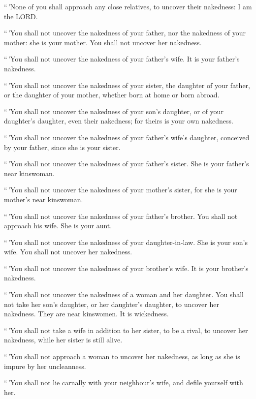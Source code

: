  ``\,'None of you shall approach any close relatives, to
uncover their nakedness: I am the LORD.

 ``\,'You shall not uncover the nakedness of your father,
nor the nakedness of your mother: she is your mother. You shall not
uncover her nakedness.

 ``\,'You shall not uncover the nakedness of your father's
wife. It is your father's nakedness.

 ``\,'You shall not uncover the nakedness of your sister,
the daughter of your father, or the daughter of your mother, whether
born at home or born abroad.

 ``\,'You shall not uncover the nakedness of your son's
daughter, or of your daughter's daughter, even their nakedness; for
theirs is your own nakedness.

 ``\,'You shall not uncover the nakedness of your father's
wife's daughter, conceived by your father, since she is your sister.

 ``\,'You shall not uncover the nakedness of your father's
sister. She is your father's near kinswoman.

 ``\,'You shall not uncover the nakedness of your mother's
sister, for she is your mother's near kinswoman.

 ``\,'You shall not uncover the nakedness of your father's
brother. You shall not approach his wife. She is your aunt.

 ``\,'You shall not uncover the nakedness of your
daughter-in-law. She is your son's wife. You shall not uncover her
nakedness.

 ``\,'You shall not uncover the nakedness of your brother's
wife. It is your brother's nakedness.

 ``\,'You shall not uncover the nakedness of a woman and
her daughter. You shall not take her son's daughter, or her daughter's
daughter, to uncover her nakedness. They are near kinswomen. It is
wickedness.

 ``\,'You shall not take a wife in addition to her sister,
to be a rival, to uncover her nakedness, while her sister is still
alive.

 ``\,'You shall not approach a woman to uncover her
nakedness, as long as she is impure by her uncleanness.

 ``\,'You shall not lie carnally with your neighbour's
wife, and defile yourself with her.

